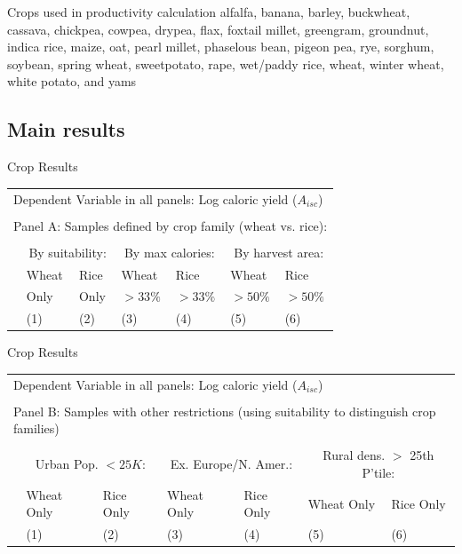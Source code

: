 \documentclass[10pt, xcolor=dvipsnames]{beamer}
\begin{document}
\begin{frame}{Crops used in productivity calculation}\label{crops}
alfalfa, banana, barley, buckwheat, cassava, chickpea, cowpea, drypea, flax, foxtail millet, greengram, groundnut, indica rice, maize, oat, pearl millet, phaselous bean, pigeon pea, rye, sorghum, soybean, spring wheat, sweetpotato, rape, wet/paddy rice, wheat, winter wheat, white potato, and yams

\hfill \hyperlink{data}{}
\end{frame}

\subsection{Main results}


\begin{frame}{Crop Results}\label{cropreg}
{\footnotesize
\begin{tabularx}{\textwidth}{lXXXXXX}
\midrule
\multicolumn{7}{l}{Dependent Variable in all panels: Log caloric yield ($A_{isc}$)} \\ \\
\multicolumn{7}{l}{Panel A: Samples defined by crop family (wheat vs. rice):} \\ \\
 & \multicolumn{2}{c}{By suitability:} & \multicolumn{2}{c}{By max calories:} & \multicolumn{2}{c}{By harvest area:}\\ \cmidrule(lr){2-3} \cmidrule(lr){4-5} \cmidrule(lr){6-7} 
 & Wheat & Rice & Wheat  & Rice  & Wheat  & Rice \\
 & Only & Only &  $>33\%$ & $>33\%$ & $>50\%$ & $>50\%$   \\
 & (1) & (2) & (3) & (4) & (5) & (6) \\
\midrule

\midrule
\end{tabularx}
}

\hfill \hyperlink{crop}{}
\end{frame}

\begin{frame}{Crop Results}

{\footnotesize
\begin{tabularx}{\textwidth}{lXXXXXX}
\midrule
\multicolumn{7}{l}{Dependent Variable in all panels: Log caloric yield ($A_{isc}$)} \\ \\
\multicolumn{7}{l}{Panel B: Samples with other restrictions (using suitability to distinguish crop families)} \\ \\
 & \multicolumn{2}{c}{Urban Pop. $<25K$:} & \multicolumn{2}{c}{Ex. Europe/N. Amer.:} & \multicolumn{2}{c}{Rural dens. $>$ 25th P'tile:}\\ \cmidrule(lr){2-3} \cmidrule(lr){4-5} \cmidrule(lr){6-7}
  & Wheat Only& Rice Only & Wheat Only& Rice Only& Wheat Only& Rice Only\\
 & (1) & (2) & (3) & (4) & (5) & (6) \\
\midrule

\midrule
\end{tabularx}
}
\end{frame}
\end{document}
